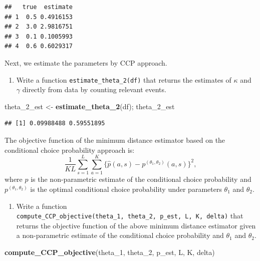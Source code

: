 \documentclass[]{book}
\newenvironment{Shaded}{\begin{snugshade}}{\end{snugshade}}
\newcommand{\KeywordTok}[1]{\textcolor[rgb]{0.13,0.29,0.53}{\textbf{#1}}}
\newcommand{\DecValTok}[1]{\textcolor[rgb]{0.00,0.00,0.81}{#1}}
\newcommand{\StringTok}[1]{\textcolor[rgb]{0.31,0.60,0.02}{#1}}
\newcommand{\NormalTok}[1]{#1}
\providecommand{\tightlist}{%
  \setlength{\itemsep}{0pt}\setlength{\parskip}{0pt}}
\begin{document}
\begin{verbatim}
##   true  estimate
## 1  0.5 0.4916153
## 2  3.0 2.9816751
## 3  0.1 0.1005993
## 4  0.6 0.6029317
\end{verbatim}

Next, we estimate the parameters by CCP approach.

\begin{enumerate}
\def\labelenumi{\arabic{enumi}.}
\setcounter{enumi}{4}
\tightlist
\item
  Write a function \texttt{estimate\_theta\_2(df)} that returns the
  estimates of \(\kappa\) and \(\gamma\) directly from data by counting
  relevant events.
\end{enumerate}

\begin{Shaded}
\begin{Highlighting}[]
\NormalTok{theta_2_est <-}\StringTok{ }\KeywordTok{estimate_theta_2}\NormalTok{(df); theta_2_est}
\end{Highlighting}
\end{Shaded}

\begin{verbatim}
## [1] 0.09988488 0.59551895
\end{verbatim}

The objective function of the minimum distance estimator based on the
conditional choice probability approach is: \[
\frac{1}{KL}\sum_{s = 1}^L \sum_{a = 1}^K\{\hat{p}(a, s) - p^{(\theta_1, \theta_2)}(a, s)\}^2,
\] where \(\hat{p}\) is the non-parametric estimate of the conditional
choice probability and \(p^{(\theta_1, \theta_2)}\) is the optimal
conditional choice probability under parameters \(\theta_1\) and
\(\theta_2\).

\begin{enumerate}
\def\labelenumi{\arabic{enumi}.}
\setcounter{enumi}{5}
\tightlist
\item
  Write a function
  \texttt{compute\_CCP\_objective(theta\_1,\ theta\_2,\ p\_est,\ L,\ K,\ delta)}
  that returns the objective function of the above minimum distance
  estimator given a non-parametric estimate of the conditional choice
  probability and \(\theta_1\) and \(\theta_2\).
\end{enumerate}

\begin{Shaded}
\begin{Highlighting}[]
\KeywordTok{compute_CCP_objective}\NormalTok{(theta_}\DecValTok{1}\NormalTok{, theta_}\DecValTok{2}\NormalTok{, p_est, L, K, delta)}
\end{Highlighting}
\end{Shaded}
\end{document}
